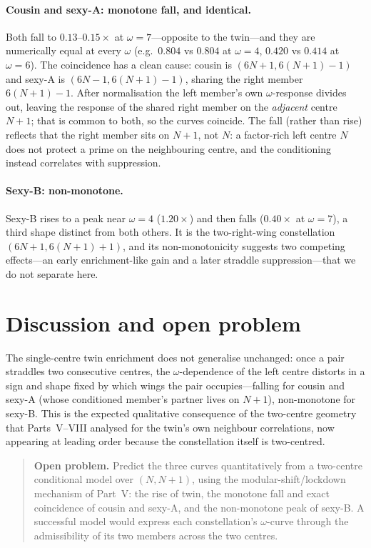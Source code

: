 \documentclass[11pt]{article}
\begin{document}
\paragraph{Cousin and sexy-A: monotone fall, and identical.}
Both fall to $0.13$--$0.15\times$ at $\omega=7$---opposite to the twin---and they
are numerically equal at every $\omega$ (e.g.\ $0.804$ vs $0.804$ at $\omega=4$,
$0.420$ vs $0.414$ at $\omega=6$). The coincidence has a clean cause: cousin is
$(6N{+}1,6(N{+}1){-}1)$ and sexy-A is $(6N{-}1,6(N{+}1){-}1)$, sharing the right
member $6(N{+}1){-}1$. After normalisation the left member's own $\omega$-response
divides out, leaving the response of the shared right member on the
\emph{adjacent} centre $N{+}1$; that is common to both, so the curves coincide.
The fall (rather than rise) reflects that the right member sits on $N{+}1$, not
$N$: a factor-rich left centre $N$ does not protect a prime on the neighbouring
centre, and the conditioning instead correlates with suppression.

\paragraph{Sexy-B: non-monotone.}
Sexy-B rises to a peak near $\omega=4$ ($1.20\times$) and then falls
($0.40\times$ at $\omega=7$), a third shape distinct from both others. It is the
two-right-wing constellation $(6N{+}1,6(N{+}1){+}1)$, and its non-monotonicity
suggests two competing effects---an early enrichment-like gain and a later
straddle suppression---that we do not separate here.

\section{Discussion and open problem}

The single-centre twin enrichment does not generalise unchanged: once a pair
straddles two consecutive centres, the $\omega$-dependence of the left centre
distorts in a sign and shape fixed by which wings the pair occupies---falling for
cousin and sexy-A (whose conditioned member's partner lives on $N{+}1$),
non-monotone for sexy-B. This is the expected qualitative consequence of the
two-centre geometry that Parts~V--VIII analysed for the twin's own neighbour
correlations, now appearing at leading order because the constellation itself is
two-centred.

\begin{quote}
\textbf{Open problem.} Predict the three curves quantitatively from a two-centre
conditional model over $(N,N{+}1)$, using the modular-shift/lockdown mechanism of
Part~V: the rise of twin, the monotone fall and exact coincidence of cousin and
sexy-A, and the non-monotone peak of sexy-B. A successful model would express
each constellation's $\omega$-curve through the admissibility of its two members
across the two centres.
\end{quote}
\end{document}
